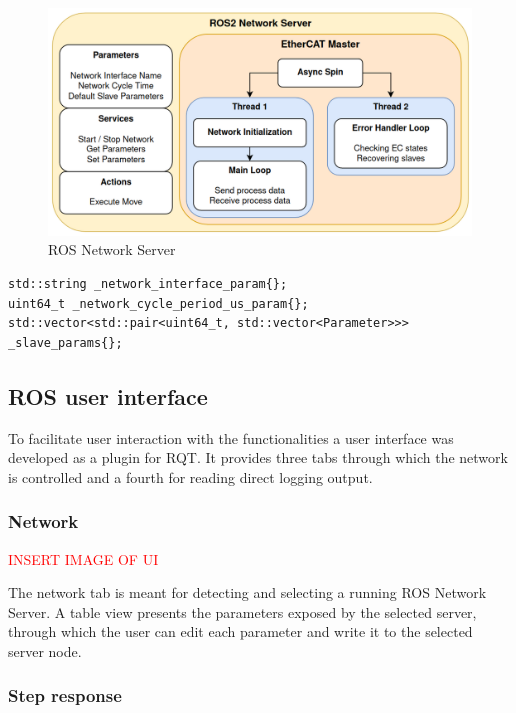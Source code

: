 \begin{figure}[H]
	\centering
	\includegraphics[width=\linewidth]{../resources/figures/ros_ecat_server.png}
	\caption{ROS Network Server}
	\label{fig:ros_ecat_server}
\end{figure}

\lstset{style=cpp}
\begin{lstlisting}[caption=ROS Server Parameters,label=lst:ros_server_parameters]
std::string _network_interface_param{};
uint64_t _network_cycle_period_us_param{};
std::vector<std::pair<uint64_t, std::vector<Parameter>>> _slave_params{};
\end{lstlisting}

\subsection{ROS user interface}

To facilitate user interaction with the functionalities a user interface was developed as a plugin for RQT.
It provides three tabs through which the network is controlled and a fourth for reading direct logging output. 

\subsubsection{Network}

\textcolor{red}{INSERT IMAGE OF UI}

The network tab is meant for detecting and selecting a running ROS Network Server. 
A table view presents the parameters exposed by the selected server, through which the user can edit each parameter and write it to the selected server node. 

\subsubsection{Step response}

